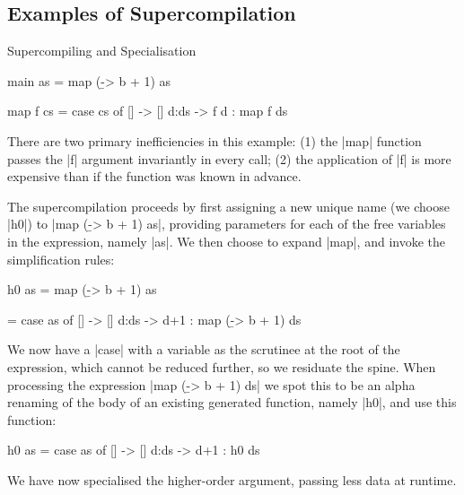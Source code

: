 \subsection{Examples of Supercompilation}

\begin{examplename}{Supercompiling and Specialisation}

\begin{code}
main as = map (\b -> b + 1) as

map f cs = case  cs of
                 []    -> []
                 d:ds  -> f d : map f ds
\end{code}

There are two primary inefficiencies in this example: (1) the |map| function passes the |f| argument invariantly in every call; (2) the application of |f| is more expensive than if the function was known in advance.

The supercompilation proceeds by first assigning a new unique name (we choose |h0|) to |map (\b -> b + 1) as|, providing parameters for each of the free variables in the expression, namely |as|. We then choose to expand |map|, and invoke the simplification rules:

\begin{code}
h0 as  = map (\b -> b + 1) as

       = case  as of
               []    -> []
               d:ds  -> d+1 : map (\b -> b + 1) ds
\end{code}

We now have a |case| with a variable as the scrutinee at the root of the expression, which cannot be reduced further, so we residuate the spine. When processing the expression |map (\b -> b + 1) ds| we spot this to be an alpha renaming of the body of an existing generated function, namely |h0|, and use this function:

\begin{code}
h0 as = case  as of
              []    -> []
              d:ds  -> d+1 : h0 ds
\end{code}

We have now specialised the higher-order argument, passing less data at runtime.
\end{examplename}

